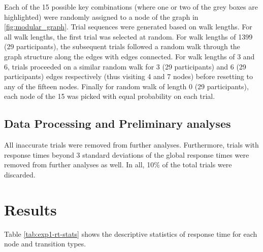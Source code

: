 Each of the 15 possible key combinations (where one or two of the grey boxes are highlighted) were randomly assigned to a node of the graph in \ref{fig:modular_graph}. Trial sequences were generated based on walk lengths. For all walk lengths, the first trial was selected at random. For walk lengths of 1399 (29 participants), the subsequent trials followed a random walk through the graph structure along the edges with edges connected. For walk lengths of 3 and 6, trials proceeded on a similar random walk for 3 (29 participants) and 6 (29 participants) edges respectively (thus visiting 4 and 7 nodes) before resetting to any of the fifteen nodes. Finally for random walk of length 0 (29 participants), each node of the 15 was picked with equal probability on each trial. 


\subsection*{Data Processing and Preliminary analyses}
All inaccurate trials were removed from further analyses. Furthermore, trials with response times beyond 3 standard deviations of the global response times were removed from further analyses as well. In all, 10\% of the total trials were discarded. 

\section{Results}
Table \ref{tab:exp1-rt-stats} shows the descriptive statistics of response time for each node and transition types. 

